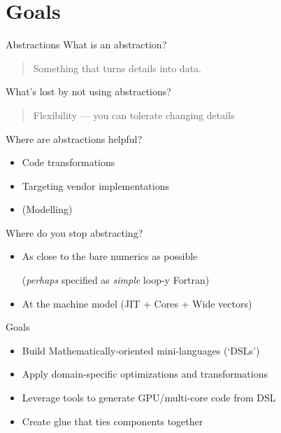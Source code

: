 \documentclass[english,compress]{beamer}
\begin{document}
\section{Goals}
\begin{frame}{Abstractions}
  What is an abstraction?

  \begin{quote}
    Something that turns details into data.
  \end{quote}

  What's lost by not using abstractions?
  \begin{quote}
    Flexibility --- you can tolerate changing
    details
  \end{quote}

  Where are abstractions helpful?
  \begin{itemize}
    \item Code transformations
    \item Targeting vendor implementations
    \item (Modelling)
  \end{itemize}

  \medskip
  Where do you stop abstracting?
  \begin{itemize}
    \item As close to the bare numerics as
      possible

      (\emph{perhaps} specified as \emph{simple} loop-y Fortran)
    \item At the machine model (JIT + Cores + Wide vectors)
  \end{itemize}
  \uncover<+->{}
\end{frame}
\begin{frame}{Goals}
  \begin{itemize}
    \item Build Mathematically-oriented mini-languages (`DSLs')
    \item Apply domain-specific optimizations and transformations
    \item Leverage tools to generate GPU/multi-core code from DSL
    \item Create glue that ties components together
  \end{itemize}
\end{frame}
\end{document}
